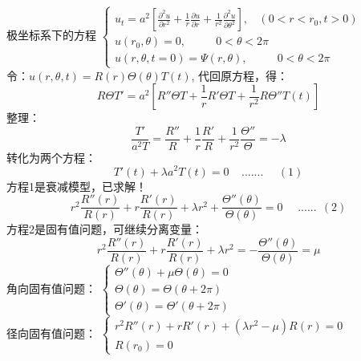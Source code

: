 	{极坐标系下的方程}
	$\begin{cases}
		\displaystyle	u_t=a^2 [ {	\frac{\partial^2 u }{\partial r^2 } +\frac{1}{r } \frac{\partial u }{\partial r } +
		\frac{1}{r^2 } \frac{\partial ^2 u }{\partial \theta ^2
		} }], ~~~~ (0<r<r_0, t>0)\\
		u(r_0,\theta)=0,~~~~~~~~~~~~ 0<\theta <2\pi 	\\
		u(r,\theta,t =0)=\Psi(r,\theta) ,~~~~~~~~~~~~ 0<\theta <2\pi 	
	\end{cases} $\\
	令：$u(r,\theta,t) =R(r)\Theta(\theta)T(t)$,  代回原方程，得：
	\begin{equation*}
		R\Theta T'=a^2 [ R'' \Theta T + \dfrac{1}{r} R' \Theta T  + \dfrac{1}{r^2} R \Theta '' T(t)  ]
	\end{equation*}
	整理：
	\begin{equation*}
		\frac{T'}{a^2T} =\frac{R''}{R}+\frac{1}{r} \frac{R'}{R} +\frac{1}{r^2} \frac{\Theta ''} {\Theta}  =-\lambda
	\end{equation*}
	转化为两个方程：
	\begin{equation*}
		T'(t)+\lambda a^2T(t)=0  ~~~~~....... ~~~~~~(1)
	\end{equation*}	
	方程1是衰减模型，已求解！\\



	\begin{equation*}
		r^2 \frac{R'' (r)}{R(r)}+r \frac{R'(r)}{R(r)} + \lambda r^2 +\frac{\Theta ''(\theta)} {\Theta (\theta)} =0  ~~~~~~......~~(2)
	\end{equation*}
	方程2是固有值问题，可继续分离变量：	
	\begin{equation*}
		r^2 \frac{R'' (r)}{R(r)}+r \frac{R'(r)}{R(r)} + \lambda r^2 =-\frac{\Theta ''(\theta)} {\Theta (\theta)} =\mu  
	\end{equation*}
	角向固有值问题：
	$ \begin{cases}
		\Theta ''(\theta)+\mu \Theta (\theta) =0 \\
		\Theta (\theta) =	\Theta (\theta+2\pi)  \\
		\Theta' (\theta) =	\Theta' (\theta+2\pi)  
	\end{cases} $\\	
	径向固有值问题：
	$ \begin{cases}
		r^2 R'' (r)+r R'(r) +( \lambda r^2 -\mu)R(r)=0  \\
		R(r_0)=0
	\end{cases} $\\	



